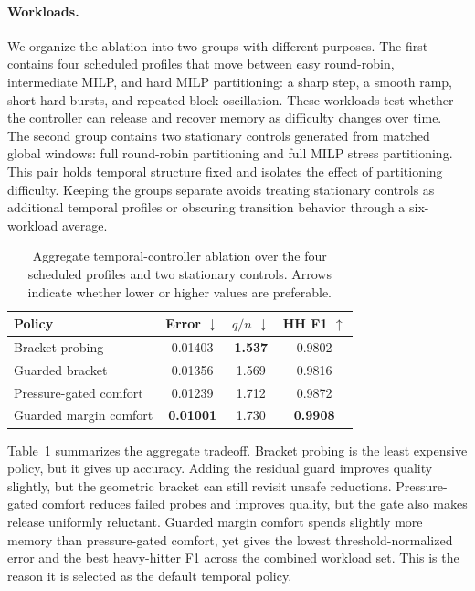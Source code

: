 \documentclass[sigconf, nonacm]{acmart}
\begin{document}
\paragraph{Workloads.}
We organize the ablation into two groups with different purposes. The first
contains four scheduled profiles that move between easy round-robin,
intermediate MILP, and hard MILP partitioning: a sharp step, a smooth ramp,
short hard bursts, and repeated block oscillation. These workloads test whether
the controller can release and recover memory as difficulty changes over time.
The second group contains two stationary controls generated from matched global
windows: full round-robin partitioning and full MILP stress partitioning. This
pair holds temporal structure fixed and isolates the effect of partitioning
difficulty. Keeping the groups separate avoids treating stationary controls as
additional temporal profiles or obscuring transition behavior through a
six-workload average.

\begin{table}[t]
\centering
\caption{Aggregate temporal-controller ablation over the four scheduled
profiles and two stationary controls. Arrows indicate whether lower or higher
values are preferable.}
\label{tab:temporal-controller-aggregate}
\begin{tabular}{lccc}
\toprule
Policy & Error \(\downarrow\) & \(q/n\) \(\downarrow\) & HH F1 \(\uparrow\) \\
\midrule
Bracket probing & 0.01403 & \textbf{1.537} & 0.9802 \\
Guarded bracket & 0.01356 & 1.569 & 0.9816 \\
Pressure-gated comfort & 0.01239 & 1.712 & 0.9872 \\
Guarded margin comfort & \textbf{0.01001} & 1.730 & \textbf{0.9908} \\
\bottomrule
\end{tabular}
\end{table}

Table~\ref{tab:temporal-controller-aggregate} summarizes the aggregate
tradeoff. Bracket probing is the least expensive policy, but it gives up
accuracy. Adding the residual guard improves quality slightly, but the
geometric bracket can still revisit unsafe reductions. Pressure-gated comfort
reduces failed probes and improves quality, but the gate also makes release
uniformly reluctant. Guarded margin comfort spends slightly more memory than
pressure-gated comfort, yet gives the lowest threshold-normalized error and
the best heavy-hitter F1 across the combined workload set. This is the reason
it is selected as the default temporal policy.
\end{document}
